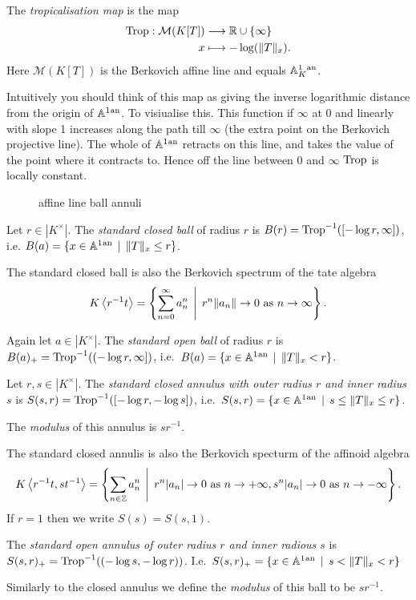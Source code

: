 \documentclass[a4paper]{article}
\newcommand{\an}{\ensuremath{{}^{\mathrm{an}}}}
\begin{document}
\begin{definition}
	The \emph{tropicalisation map} is the map 
	\begin{align*}
		\operatorname{Trop} :  \mathcal{M} (K[T]) &\longrightarrow \mathbb{R} \cup \{\infty\}  \\
		x &\longmapsto -\log( \|T\|_x)
	.\end{align*}
	Here $\mathcal{M} (K[T])$ is the Berkovich affine line and equals $\aff^{1}_K\an$. 
\end{definition}
Intuitively you should think of this map as giving the inverse logarithmic distance from the origin of $\aff^{1}\an$. 
To visiualise this. This function if $\infty$ at $0$ and linearly with slope 1 increases along the path till $\infty$ (the extra point on the Berkovich projective line). 
The whole of $\aff^{1}\an $ retracts on this line, and takes the value of the point where it contracts to. Hence off the line between $0$ and $\infty$  $\operatorname{Trop}$ is locally constant. 

\begin{figure}[ht]
    \centering
    \caption{affine line ball annuli}
    \label{fig:affine-line-ball-annuli}
\end{figure}


\begin{definition}
	Let $r \in |K^{\times }|$. The \emph{standard closed ball} of radius $r$ is $B(r) = \operatorname{Trop}^{-1}([-\log r, \infty])$, i.e. $B(a) = \{x \in \aff^{1}\an \st \|T\|_x \le r\} $. 
\end{definition}
The standard closed ball is also the Berkovich spectrum of the tate algebra \[
K\left<r^{-1}t \right> = \left\{\sum_{n = 0}^{\infty} a_n ^{n} \st r ^{n} \|a_n\| \to 0 \text{ as } n \to \infty \right\} 
.\] 
\begin{definition}
	Again let $a \in |K^{\times }|$. 
	The \emph{standard open ball} of radius $r$ is $B(a)_+ = \operatorname{Trop}^{-1}((-\log r, \infty])$, i.e.\ $B(a) = \{x \in \aff^{1}\an \st \|T\|_x <  r\} $.
\end{definition}

\begin{definition}
	Let $r, s \in |K^{\times }|$. 
	The \emph{standard closed annulus with outer radius  $r$ and inner radius  $s$}  is $S(s, r) = \operatorname{Trop}^{-1}([-\log r, -\log s])$, i.e.\ $S(s, r) = \{x \in \aff^{1}\an \st s \le \|T\|_x \le r\} $.

	The \emph{modulus} of this annulus is $s r^{-1}$. 
\end{definition}
The standard closed annulis is also the Berkovich specturm of the affinoid algebra \[
	K\left<r^{-1}t, st^{-1} \right> = \left\{\sum_{n \in \Z}^{} a_n ^{n} \st r^{n}|a_n| \to 0 \text{ as } n \to +\infty, s^n |a_n| \to 0 \text{ as } n \to - \infty\right\} 
.\] 
If $r = 1$ then we write $S(s) = S(s,1)$. 
\begin{definition}
	The \emph{standard open annulus of outer radius $r$ and inner radious $s$} is $S(s,r)_+ = \operatorname{Trop}^{-1}((-\log s, -\log r))$. 
	I.e.\ $S(s,r)_+ = \{x \in \aff^{1}\an \st s < \|T\|_x < r\} $

	Similarly to the closed annulus we define the \emph{modulus} of this ball to be $s r^{-1}$. 
\end{definition}
\end{document}
